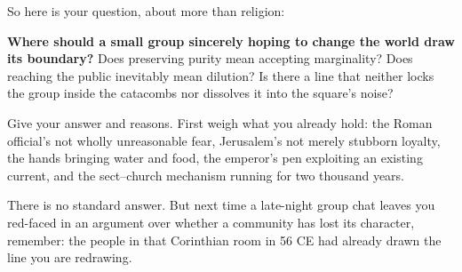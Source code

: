So here is your question, about more than religion:

\textbf{Where should a small group sincerely hoping to change the world draw its boundary?} Does preserving purity mean accepting marginality? Does reaching the public inevitably mean dilution? Is there a line that neither locks the group inside the catacombs nor dissolves it into the square's noise?

Give your answer and reasons. First weigh what you already hold: the Roman official's not wholly unreasonable fear, Jerusalem's not merely stubborn loyalty, the hands bringing water and food, the emperor's pen exploiting an existing current, and the sect--church mechanism running for two thousand years.

There is no standard answer. But next time a late-night group chat leaves you red-faced in an argument over whether a community has lost its character, remember: the people in that Corinthian room in 56 CE had already drawn the line you are redrawing.
